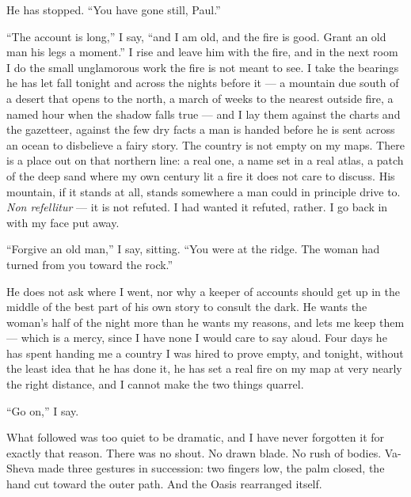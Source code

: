 He has stopped. ``You have gone still, Paul.''\par

``The account is long,'' I say, ``and I am old, and the fire is good. Grant an old man his legs a moment.'' I rise and leave him with the fire, and in the next room I do the small unglamorous work the fire is not meant to see. I take the bearings he has let fall tonight and across the nights before it --- a mountain due south of a desert that opens to the north, a march of weeks to the nearest outside fire, a named hour when the shadow falls true --- and I lay them against the charts and the gazetteer, against the few dry facts a man is handed before he is sent across an ocean to disbelieve a fairy story. The country is not empty on my maps. There is a place out on that northern line: a real one, a name set in a real atlas, a patch of the deep sand where my own century lit a fire it does not care to discuss. His mountain, if it stands at all, stands somewhere a man could in principle drive to. \textit{Non refellitur} --- it is not refuted. I had wanted it refuted, rather. I go back in with my face put away.\par

``Forgive an old man,'' I say, sitting. ``You were at the ridge. The woman had turned from you toward the rock.''\par

He does not ask where I went, nor why a keeper of accounts should get up in the middle of the best part of his own story to consult the dark. He wants the woman's half of the night more than he wants my reasons, and lets me keep them --- which is a mercy, since I have none I would care to say aloud. Four days he has spent handing me a country I was hired to prove empty, and tonight, without the least idea that he has done it, he has set a real fire on my map at very nearly the right distance, and I cannot make the two things quarrel.\par

``Go on,'' I say.\par

\ornament

\noindent What followed was too quiet to be dramatic, and I have never forgotten it for exactly that reason. There was no shout. No drawn blade. No rush of bodies. Va-Sheva made three gestures in succession: two fingers low, the palm closed, the hand cut toward the outer path. And the Oasis rearranged itself.\par

